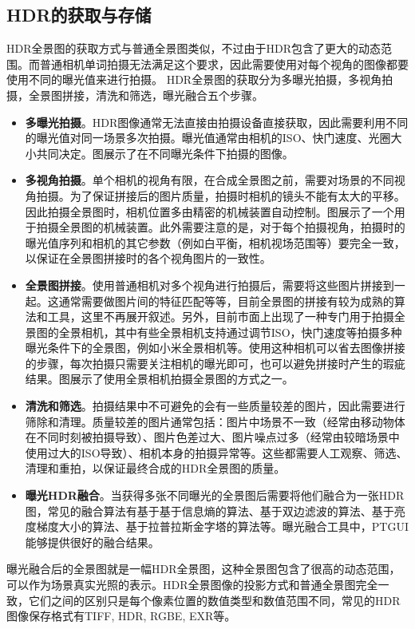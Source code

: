 \subsection{HDR的获取与存储}
HDR全景图的获取方式与普通全景图类似，不过由于HDR包含了更大的动态范围。而普通相机单词拍摄无法满足这个要求，因此需要使用对每个视角的图像都要使用不同的曝光值来进行拍摄。
HDR全景图的获取分为多曝光拍摄，多视角拍摄，全景图拼接，清洗和筛选，曝光融合五个步骤。
\begin{itemize}
    \item \textbf{多曝光拍摄}。HDR图像通常无法直接由拍摄设备直接获取，因此需要利用不同的曝光值对同一场景多次拍摄。曝光值通常由相机的ISO、快门速度、光圈大小共同决定。图展示了在不同曝光条件下拍摄的图像。
    \item \textbf{多视角拍摄}。单个相机的视角有限，在合成全景图之前，需要对场景的不同视角拍摄。为了保证拼接后的图片质量，拍摄时相机的镜头不能有太大的平移。因此拍摄全景图时，相机位置多由精密的机械装置自动控制。图展示了一个用于拍摄全景图的机械装置。此外需要注意的是，对于每个拍摄视角，拍摄时的曝光值序列和相机的其它参数（例如白平衡，相机视场范围等）要完全一致，以保证在全景图拼接时的各个视角图片的一致性。
    \item \textbf{全景图拼接}。使用普通相机对多个视角进行拍摄后，需要将这些图片拼接到一起。这通常需要做图片间的特征匹配等等，目前全景图的拼接有较为成熟的算法和工具，这里不再展开叙述。另外，目前市面上出现了一种专门用于拍摄全景图的全景相机，其中有些全景相机支持通过调节ISO，快门速度等拍摄多种曝光条件下的全景图，例如小米全景相机\cite{xiaomi}等。使用这种相机可以省去图像拼接的步骤，每次拍摄只需要关注相机的曝光即可，也可以避免拼接时产生的瑕疵结果。图展示了使用全景相机拍摄全景图的方式之一。
    \item \textbf{清洗和筛选}。拍摄结果中不可避免的会有一些质量较差的图片，因此需要进行筛除和清理。质量较差的图片通常包括：图片中场景不一致（经常由移动物体在不同时刻被拍摄导致）、图片色差过大、图片噪点过多（经常由较暗场景中使用过大的ISO导致）、相机本身的拍摄异常等。这些都需要人工观察、筛选、清理和重拍，以保证最终合成的HDR全景图的质量。
    \item \textbf{曝光HDR融合}。当获得多张不同曝光的全景图后需要将他们融合为一张HDR图，常见的融合算法有基于基于信息熵的算法、基于双边滤波的算法、基于亮度梯度大小的算法、基于拉普拉斯金字塔的算法等。曝光融合工具中，PTGUI\cite{ptgui}能够提供很好的融合结果。
\end{itemize}
曝光融合后的全景图就是一幅HDR全景图，这种全景图包含了很高的动态范围，可以作为场景真实光照的表示。HDR全景图像的投影方式和普通全景图完全一致，它们之间的区别只是每个像素位置的数值类型和数值范围不同，常见的HDR图像保存格式有TIFF, HDR, RGBE, EXR等。

